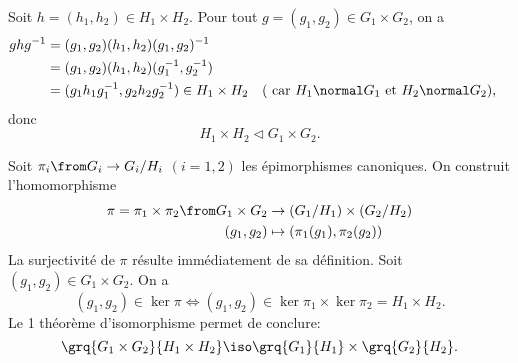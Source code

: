 Soit $h = (h_1,h_2)\in H_1\times H_2$.
Pour tout $g = (g_1,g_2)\in G_1\times G_2$, on a
%
\begin{align*}
  ghg^{-1}
    &= (g_1,g_2)(h_1,h_2)(g_1,g_2)^{-1} \\
    &= (g_1,g_2)(h_1,h_2)(g_1^{-1},g_2^{-1}) \\
    &= (g_1 h_1 g_1^{-1},g_2 h_2 g_2^{-1})\in H_1\times H_2
    && \text{( car $H_1\normal G_1$ et $H_2\normal G_2$)},
\end{align*}
%
donc
\[
  H_1\times H_2\lhd G_1\times G_2.
\]

Soit $\pi_i\from G_i\to G_i/H_i$ $(i = 1,2)$ les épimorphismes canoniques. On
construit l'homomorphisme
%
\begin{align*}
  \pi=\pi_1\times\pi_2\from G_1\times G_2 &\to (G_1/H_1)\times(G_2/H_2)\\
  (g_1,g_2) &\mapsto (\pi_1(g_1),\pi_2(g_2))
\end{align*}
%
La surjectivité de $\pi$ résulte immédiatement de sa définition. Soit
$(g_1,g_2)\in G_1\times G_2$. On a
\[
  (g_1,g_2)\in\ker\pi
  \iff (g_1,g_2)\in\ker\pi_1\times\ker\pi_2 = H_1\times H_2.
\]
Le 1 théorème d'isomorphisme permet de conclure:
\[
  \grq{G_1\times G_2}{H_1\times H_2}\iso\grq{G_1}{H_1}\times\grq{G_2}{H_2}.
\]

